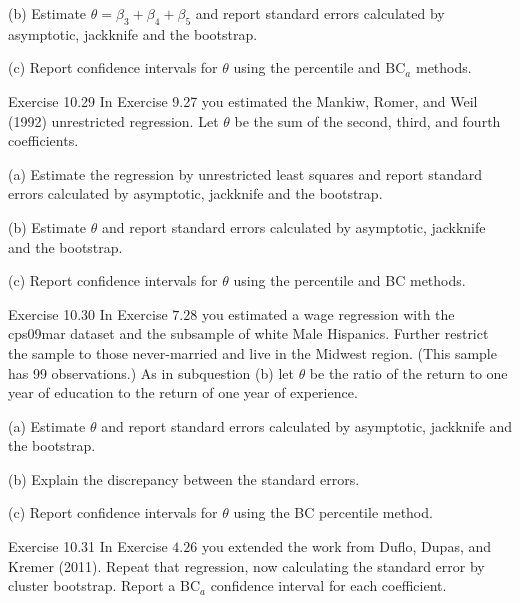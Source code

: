 \documentclass[10pt]{article}
\begin{document}
(b) Estimate $\theta=\beta_{3}+\beta_{4}+\beta_{5}$ and report standard errors calculated by asymptotic, jackknife and the bootstrap.

(c) Report confidence intervals for $\theta$ using the percentile and $\mathrm{BC}_{a}$ methods.

Exercise 10.29 In Exercise 9.27 you estimated the Mankiw, Romer, and Weil (1992) unrestricted regression. Let $\theta$ be the sum of the second, third, and fourth coefficients.

(a) Estimate the regression by unrestricted least squares and report standard errors calculated by asymptotic, jackknife and the bootstrap.

(b) Estimate $\theta$ and report standard errors calculated by asymptotic, jackknife and the bootstrap.

(c) Report confidence intervals for $\theta$ using the percentile and BC methods.

Exercise 10.30 In Exercise $7.28$ you estimated a wage regression with the cps09mar dataset and the subsample of white Male Hispanics. Further restrict the sample to those never-married and live in the Midwest region. (This sample has 99 observations.) As in subquestion (b) let $\theta$ be the ratio of the return to one year of education to the return of one year of experience.

(a) Estimate $\theta$ and report standard errors calculated by asymptotic, jackknife and the bootstrap.

(b) Explain the discrepancy between the standard errors.

(c) Report confidence intervals for $\theta$ using the BC percentile method.

Exercise 10.31 In Exercise $4.26$ you extended the work from Duflo, Dupas, and Kremer (2011). Repeat that regression, now calculating the standard error by cluster bootstrap. Report a $\mathrm{BC}_{a}$ confidence interval for each coefficient.
\end{document}
